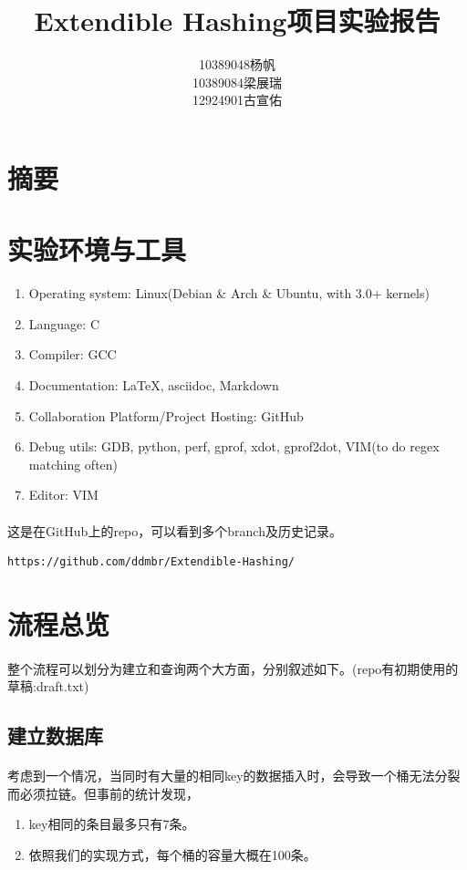 \documentclass{article}
\title{Extendible Hashing项目实验报告}
\author{10389048杨帆 \\ 10389084梁展瑞 \\ 12924901古宣佑}
\begin{document}
\maketitle
\section{摘要}
\section{实验环境与工具}
    \begin{enumerate}
        \item Operating system: Linux(Debian \& Arch \& Ubuntu, with 3.0+ kernels)
        \item Language: C
        \item Compiler: GCC
        \item Documentation: \LaTeX , asciidoc, Markdown
        \item Collaboration Platform/Project Hosting: GitHub
        \item Debug utils: GDB, python, perf, gprof, xdot, gprof2dot, VIM(to do regex matching often)
        \item Editor: VIM
    \end{enumerate}
    \paragraph{}
        这是在GitHub上的repo，可以看到多个branch及历史记录。
    \begin{verbatim}
https://github.com/ddmbr/Extendible-Hashing/
    \end{verbatim}
\section{流程总览}
    \paragraph{}
        整个流程可以划分为建立和查询两个大方面，分别叙述如下。(repo有初期使用的草稿:draft.txt)
    \subsection{建立数据库}
        \paragraph{}
            考虑到一个情况，当同时有大量的相同key的数据插入时，会导致一个桶无法分裂而必须拉链。但事前的统计发现，
        \begin{enumerate}
            \item key相同的条目最多只有7条。
            \item 依照我们的实现方式，每个桶的容量大概在100条。
        \end{enumerate}
\end{document}

